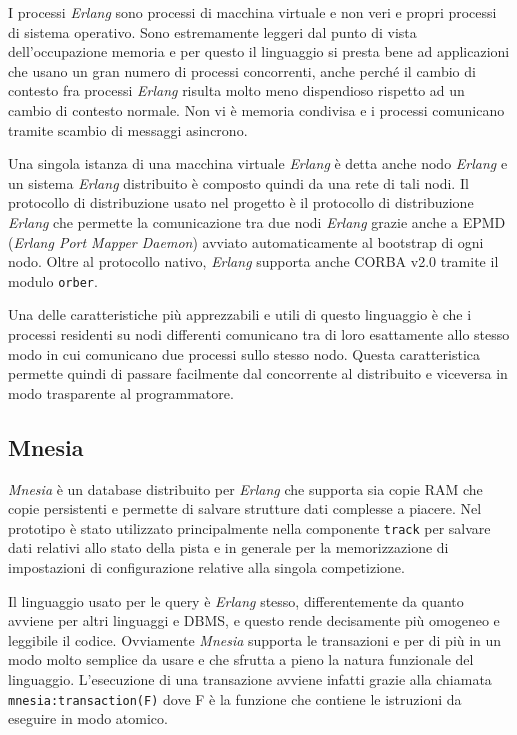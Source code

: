 \documentclass[a4paper]{report}
\newcommand{\Erlang}{\textsl{Erlang}}
\newcommand{\fun}[1]{\texttt{#1}}
\begin{document}
I processi \Erlang{} sono processi di macchina virtuale e non veri e propri processi di sistema operativo. Sono estremamente leggeri dal punto di vista dell'occupazione memoria e per questo il linguaggio si presta bene ad applicazioni che usano un gran numero di processi concorrenti, anche perché il cambio di contesto fra processi \Erlang{} risulta molto meno dispendioso rispetto ad un cambio di contesto normale.
Non vi è memoria condivisa e i processi comunicano tramite scambio di messaggi asincrono.



Una singola istanza di una macchina virtuale \Erlang{} è detta anche nodo \Erlang{} e un sistema \Erlang{} distribuito è composto quindi da una rete di tali nodi. Il protocollo di distribuzione usato nel progetto è il protocollo di distribuzione \Erlang{} che permette la comunicazione tra due nodi \Erlang{} grazie anche a EPMD (\textsl{Erlang Port Mapper Daemon}) avviato automaticamente al bootstrap di ogni nodo. Oltre al protocollo nativo, \Erlang{} supporta anche CORBA v2.0 tramite il modulo \texttt{orber}.

Una delle caratteristiche più apprezzabili e utili di questo linguaggio è che i processi residenti su nodi differenti comunicano tra di loro esattamente allo stesso modo in cui comunicano due processi sullo stesso nodo. Questa caratteristica permette quindi di passare facilmente dal concorrente al distribuito e viceversa in modo trasparente al programmatore.

\subsection*{Mnesia}
\textsl{Mnesia} è un database distribuito per \Erlang{} che supporta sia copie RAM che copie persistenti e permette di salvare strutture dati complesse a piacere. Nel prototipo è stato utilizzato principalmente nella componente \texttt{track} per salvare dati relativi allo stato della pista e in generale per la memorizzazione di impostazioni di configurazione relative alla singola competizione.

Il linguaggio usato per le query è \Erlang{} stesso, differentemente da quanto avviene per altri linguaggi e DBMS, e questo rende decisamente più omogeneo e leggibile il codice. Ovviamente \textsl{Mnesia} supporta le transazioni e per di più in un modo molto semplice da usare e che sfrutta a pieno la natura funzionale del linguaggio. L'esecuzione di una transazione avviene infatti grazie alla chiamata \fun{mnesia:transaction(F)} dove F è la funzione che contiene le istruzioni da eseguire in modo atomico.
\end{document}
